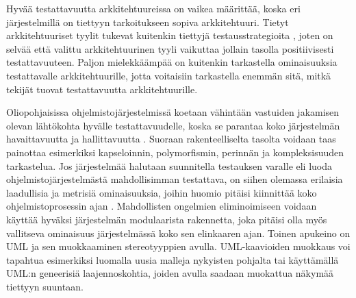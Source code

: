 \documentclass[finnish]{tktltiki2}
\numberwithin{table}{section}
\theoremstyle{definition}
\theoremstyle{remark}
\begin{document}
 
Hyvää testattavuutta arkkitehtuureissa on vaikea määrittää, koska eri järjestelmillä on tiettyyn tarkoitukseen sopiva arkkitehtuuri. Tietyt arkkitehtuuriset tyylit tukevat kuitenkin tiettyjä testausstrategioita \citep{Eickelmann:1996:MOS:243327.243602}, joten on selvää että valittu arkkitehtuurinen tyyli vaikuttaa jollain tasolla positiivisesti testattavuuteen. Paljon mielekkäämpää on kuitenkin tarkastella  ominaisuuksia testattavalle arkkitehtuurille, jotta voitaisiin tarkastella enemmän sitä, mitkä tekijät tuovat testattavuutta arkkitehtuurille.

Oliopohjaisissa ohjelmistojärjestelmissä koetaan vähintään vastuiden jakamisen olevan  lähtökohta hyvälle testattavuudelle, koska se parantaa koko järjestelmän havaittavuutta ja hallittavuutta \citep{Binder:1994:DTO:182987.184077}. Suoraan rakenteelliselta tasolta voidaan taas painottaa esimerkiksi kapseloinnin, polymorfismin, perinnän ja kompleksisuuden tarkastelua. Jos järjestelmää halutaan suunnitella testauksen varalle eli luoda ohjelmistojärjestelmästä mahdollisimman testattava, on siihen olemassa erilaisia laadullisia ja metrisiä ominaisuuksia, joihin huomio pitäisi kiinnittää koko ohjelmistoprosessin ajan \citep{joshi_design_2014}. Mahdollisten ongelmien eliminoimiseen voidaan käyttää hyväksi järjestelmän modulaarista rakennetta, joka pitäisi olla myös vallitseva ominaisuus järjestelmässä koko sen elinkaaren ajan. Toinen apukeino on UML ja sen  muokkaaminen stereotyyppien avulla. UML-kaavioiden muokkaus voi tapahtua esimerkiksi luomalla uusia malleja nykyisten pohjalta tai käyttämällä UML:n geneerisiä laajennoskohtia, joiden avulla saadaan muokattua näkymää tiettyyn suuntaan.



\end{document}
